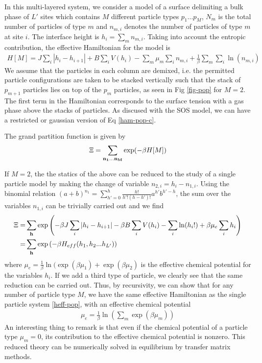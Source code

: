 In this multi-layered system, we consider a model of a surface delimiting a bulk phase of $L'$ sites which contains $M$ different particle types $p_1 ... p_M$, $N_m$ is the total number of particles of type $m$ and $n_{m,i}$ denotes the number of particles of type $m$ at site $i$. The interface height is $h_i = \sum_m n_{m,i}$. Taking into account the entropic contribution, the effective Hamiltonian for the model is
\begin{align}
H[M] = J \sum_i |h_i-h_{i+1}| + B \sum_i V(h_i) - \sum_m \mu_m \sum_i n_{m,i} + \frac{1}{\beta} \sum_m \sum_i \ln(n_{m,i})
\label{ham-pop-c}
\end{align}
We assume that the particles in each column are demixed, i.e. the permitted particle configurations are taken to be stacked vertically such that the stack of $p_{m+1}$ particles lies on top of the $p_m$ particles, as seen in Fig \ref{fig-pop} for $M=2$. The first term in the Hamiltonian corresponds to the surface tension with a gas phase above the stacks of particles. As discused with the SOS model, we can have a restricted or gaussian version of Eq \ref{ham-pop-c}. 

The grand partition function is given by
\begin{align}
\Xi = \sum_{{\bf n_1...n_M}} \exp(-\beta H[M])
\end{align}

If $M=2$, the the statics of the above can be reduced to the study of a single particle model by making the change of variable $n_{2,i} = h_i - n_{1,i}$. Using the binomial relation ${(a+b)^{n_1} = \sum_{h'=0}^h \frac{h!}{h'! (h-h')!} a^{h'} b^{h'-h}}$, the sum over the variables $n_{1,i}$ can be trivially carried out and we find
\begin{align}
\Xi =& \sum_{\bf h} \exp \left( -\beta J \sum_i |h_i-h_{i+1}| - \beta B \sum_i V(h_i) - \sum_i \ln(h_i!) + \beta \mu_e \sum_i h_i \right) \nonumber \\
=& \sum_{\bf h} \exp \left( -\beta H_{eff}(h_1,h_2...h_{L'}) \right)
\end{align}
where $\mu_e = \frac{1}{\beta}\ln( \exp(\beta \mu_1) + \exp(\beta \mu_2)$ is the effective chemical potential for the variables $h_i$. If we add a third type of particle, we clearly see that the same reduction can be carried out. Thus, by recursivity, we can show that for any number of particle type $M$, we have the same effective Hamiltonian as the single particle system \eqref{heff-pop}, with an effective chemical potential
\begin{align}
\mu_e = \frac{1}{\beta} \ln \left( \sum_m \exp( \beta \mu_m ) \right)
\end{align}
An interesting thing to remark is that even if the chemical potential of a particle type $\mu_m = 0$, its contribution to the effective chemical potential is nonzero. 
This reduced theory can be numerically solved in equilibrium by transfer matrix methods. 

